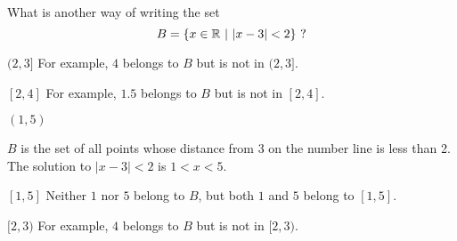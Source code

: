 \documentclass{mathquiz}
\begin{document}
\begin{question}
What is another way of writing the set
\[B= \{x \in {\mathbb R}\ |\ |x-3|<2 \}\ \rm{?}\]
\begin{choice}
\incorrect $(2,3]$
\response For example, $4$ belongs to $B$ but is not in $(2,3]$.

\incorrect $[2,4]$
\response For example, $1.5$ belongs to $B$ but is not in $[2,4]$.

\correct $(1,5)$

\response $B$ is the set of all points whose distance from 3 on the
number line is less than 2. \\
The solution to $|x-3|<2$ is $1<x<5$.

\incorrect $[1,5]$
\response Neither $1$ nor $5$  belong to $B$, but both $1$ and $5$ belong to $[1,5]$.

\incorrect $[2,3)$
\response For example, $4$ belongs to $B$ but is not in $[2,3)$.

\end{choice}
\end{question}
\end{document}
